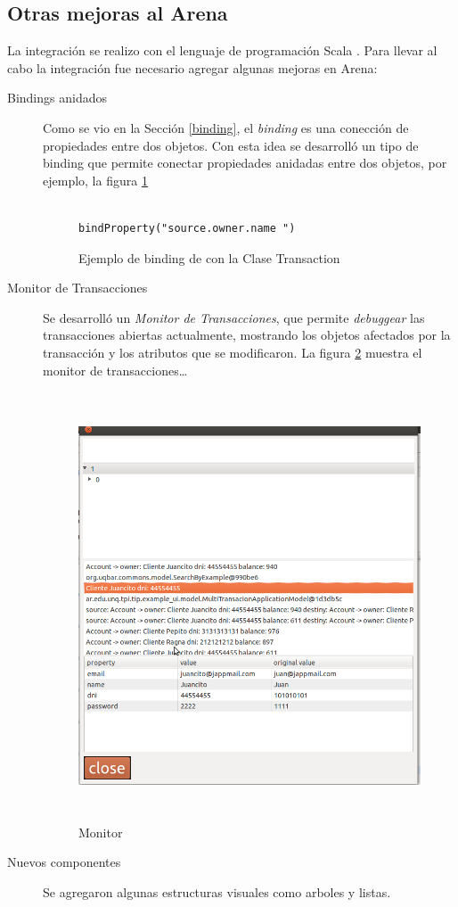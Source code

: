 \subsection{Otras mejoras al Arena}
	La integración se realizo con el lenguaje de programación Scala
	\cite{OderskySpoonVenners08}. Para llevar al cabo la integración fue necesario agregar algunas
	mejoras en Arena:
	\begin{description}

	  \item[Bindings anidados] Como se vio en la Sección \ref{binding},
		  el \emph{binding} es una conección de propiedades entre dos objetos. Con
		  esta idea se desarrolló un tipo de binding que permite conectar propiedades
		  anidadas entre dos objetos, por ejemplo,  la figura \ref{bindAnidado}

			\begin{figure}[h]
			\centering
					\begin{lstlisting}
						bindProperty("source.owner.name	") 
					\end{lstlisting}
			\caption{Ejemplo de binding de con la Clase Transaction}
			\label{bindAnidado}
		\end{figure}	

	  \item[Monitor de Transacciones]
		 Se desarrolló un \emph{Monitor de Transacciones}, que permite
		 \emph{debuggear} las transacciones abiertas actualmente, mostrando
		 los objetos afectados por la transacción y los atributos que se
		 modificaron.
		La figura \ref{monitor} muestra el monitor de transacciones\ldots
		
		\begin{figure}[h]
			\centering
			\includegraphics[width=430px, height=480px]{img/monitorTransacciones.png}
			\caption{Monitor}
			\label{monitor}
		\end{figure}	
	
	  \item[Nuevos componentes] Se agregaron algunas estructuras visuales como
	  arboles y listas.
	\end{description}
